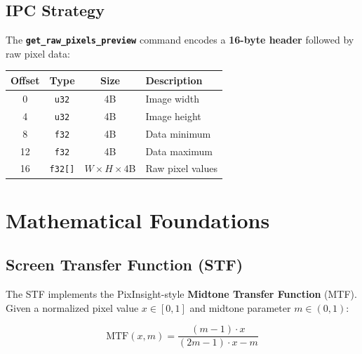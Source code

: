 \documentclass[11pt,a4paper]{article}
\newcommand{\code}[1]{\texttt{\small #1}}
\newcommand{\cmd}[1]{\texttt{\bfseries #1}}
\begin{document}
    \subsection{IPC Strategy}

    \begin{infobox}
        The \cmd{get\_raw\_pixels\_preview} command encodes a \textbf{16-byte header} followed by raw pixel data:
        \begin{center}
            \begin{tabular}{cccl}
                \toprule
                \textbf{Offset} & \textbf{Type} & \textbf{Size} & \textbf{Description} \\
                \midrule
                0 & \code{u32} & 4B & Image width \\
                4 & \code{u32} & 4B & Image height \\
                8 & \code{f32} & 4B & Data minimum \\
                12 & \code{f32} & 4B & Data maximum \\
                16 & \code{f32[]} & $W \times H \times 4$B & Raw pixel values \\
                \bottomrule
            \end{tabular}
        \end{center}
    \end{infobox}


    \section{Mathematical Foundations}
    \label{sec:math}

    \subsection{Screen Transfer Function (STF)}
    \label{sec:stf}

    The STF implements the PixInsight-style \textbf{Midtone Transfer Function} (MTF). Given a normalized pixel value $x \in [0, 1]$ and midtone parameter $m \in (0, 1)$:

    \begin{equation}
        \boxed{
            \text{MTF}(x, m) = \frac{(m - 1) \cdot x}{(2m - 1) \cdot x - m}
        }
        \label{eq:mtf}
    \end{equation}
\end{document}
